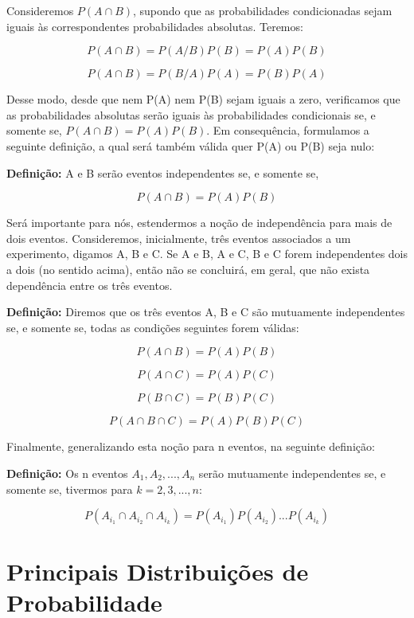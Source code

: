 Consideremos $P(A \cap B)$, supondo que as probabilidades
condicionadas sejam iguais às correspondentes probabilidades
absolutas. Teremos:

$$
P(A \cap B)= P(A/B)P(B)=P(A)P(B)
$$

$$
P(A \cap B)= P(B/A)P(A)=P(B)P(A)
$$


Desse modo, desde que nem P(A) nem P(B) sejam iguais a zero,
verificamos que as probabilidades absolutas serão iguais às
probabilidades condicionais se, e somente se, $P(A \cap
B)=P(A)P(B)$. Em consequência, formulamos a seguinte definição, a
qual será também válida quer P(A) ou P(B) seja nulo:\vskip0.3cm

\textbf{Definição:} A e B serão eventos independentes se, e
somente se,

$$
P(A \cap B) = P(A)P(B)
$$


Será importante para nós, estendermos a noção de independência
para mais de dois eventos. Consideremos, inicialmente, três
eventos associados a um experimento, digamos A, B e C. Se A e B, A
e C, B e C forem independentes dois a dois (no sentido acima),
então não se concluirá, em geral, que não exista dependência entre
os três eventos.\vskip0.3cm

\textbf{Definição:} Diremos que os três eventos A, B e C são
mutuamente independentes se, e somente se, todas as condições
seguintes forem válidas:

$$
P(A \cap B)=P(A)P(B)
$$

$$
P(A \cap C)=P(A)P(C)
$$

$$
P(B \cap C)=P(B)P(C)
$$

$$
P(A \cap B \cap C)=P(A)P(B)P(C)
$$


Finalmente, generalizando esta noção para n eventos, na seguinte
definição:\vskip0.3cm



\textbf{Definição:} Os n eventos $A_{1},A_{2},...,A_{n}$ serão
mutuamente independentes se, e somente se, tivermos para
$k=2,3,...,n$:

\begin{equation}\label{}
    P(A_{i_{1}} \cap A_{i_{2}} \cap A_{i_{k}})=
    P(A_{i_{1}})P(A_{i_{2}})...P(A_{i_{k}})
\end{equation}



\section{Principais Distribuições de Probabilidade}
 

